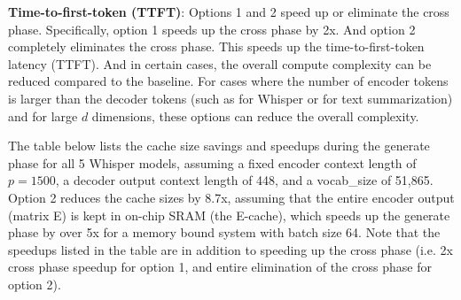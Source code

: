 \documentclass{article}
\numberwithin{equation}{section} %
\begin{document}
\textbf{Time-to-first-token (TTFT)}: Options 1 and 2 speed up or eliminate the cross phase. Specifically, option 1 speeds up the cross phase by 2x. And option 2 completely eliminates the cross phase. This speeds up the time-to-first-token latency (TTFT). And in certain cases, the overall compute complexity can be reduced compared to the baseline. For cases where the number of encoder tokens is larger than the decoder tokens (such as for Whisper or for text summarization) and for large $d$ dimensions, these options can reduce the overall complexity.

The table below lists the cache size savings and speedups during the generate phase for all 5 Whisper models, assuming a fixed encoder context length of $p = 1500$, a decoder output context length of 448, and a vocab\_size of 51,865. Option 2 reduces the cache sizes by 8.7x, assuming that the entire encoder output (matrix E) is kept in on-chip SRAM (the E-cache), which speeds up the generate phase by over 5x for a memory bound system with batch size 64. Note that the speedups listed in the table are in addition to speeding up the cross phase (i.e. 2x cross phase speedup for option 1, and entire elimination of the cross phase for option 2).
\end{document}
